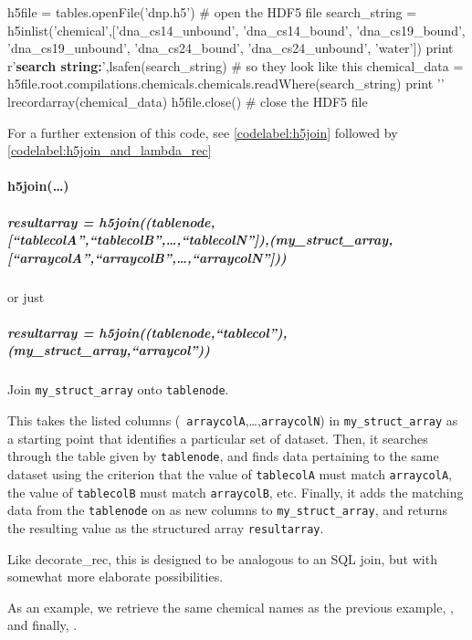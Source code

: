 \label{codelabel:h5inlist}
\begin{python}
h5file = tables.openFile('dnp.h5') # open the HDF5 file
search_string = h5inlist('chemical',['dna_cs14_unbound',
    'dna_cs14_bound',
    'dna_cs19_bound',
    'dna_cs19_unbound',
    'dna_cs24_bound',
    'dna_cs24_unbound',
    'water'])
print r'\textbf{search string:}',lsafen(search_string) # so they look like this
chemical_data = h5file.root.compilations.chemicals.chemicals.readWhere(search_string)
print '\n{}\n\n'
lrecordarray(chemical_data)
h5file.close() # close the HDF5 file
\end{python}

For a further extension of this code, see \ref{codelabel:h5join} followed by \ref{codelabel:h5join_and_lambda_rec}
\paragraph{h5join(\ldots)}\label{sec:writeup_software_h5inlist}
\subparagraph{resultarray = h5join((tablenode,[``tablecolA'',``tablecolB'',\ldots,``tablecolN'']),(my\_struct\_array,[``arraycolA'',``arraycolB'',\ldots,``arraycolN'']))}

or just

\subparagraph{resultarray = h5join((tablenode,``tablecol''),(my\_struct\_array,``arraycol''))}

Join \texttt{my\_struct\_array} onto \texttt{tablenode}.

This takes the listed columns (\ie~\texttt{arraycolA},\ldots,\texttt{arraycolN}) in
    \texttt{my\_struct\_array} as a starting point that identifies a
    particular set of dataset.
Then, it searches through the table given by \texttt{tablenode}, and finds
    data pertaining to the same dataset using the criterion that
    the value of \texttt{tablecolA} must match \texttt{arraycolA}, the value of
    \texttt{tablecolB} must match \texttt{arraycolB}, etc.
Finally, it adds the matching data from the \texttt{tablenode} on as new
    columns to \texttt{my\_struct\_array}, and returns the resulting value
    as the structured array \texttt{resultarray}.

Like decorate\_rec, this is designed to be analogous to an SQL
    join, but with somewhat more elaborate possibilities.

As an example, we retrieve the same chemical names as the
    previous example, , and finally, .

